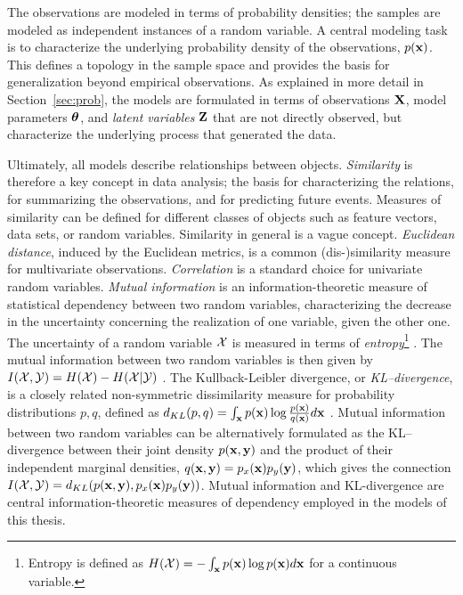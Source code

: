 The observations are modeled in terms of probability densities; the
samples are modeled as independent instances of a random variable.  A
central modeling task is to characterize the underlying probability
density of the observations, \(p(\mathbf{x})\). This defines a topology in the
sample space and provides the basis for generalization beyond
empirical observations. As explained in more detail in
Section~\ref{sec:prob}, the models are formulated in terms of
observations \(\mathbf{X}\), model parameters $\boldsymbol{\theta}$, and {\it latent
  variables} \(\mathbf{Z}\) that are not directly observed, but characterize
the underlying process that generated the data.

Ultimately, all models describe relationships between objects.  {\it
Similarity} is therefore a key concept in data analysis; the basis for
characterizing the relations, for summarizing the observations, and
for predicting future events. Measures of similarity can be defined
for different classes of objects such as feature vectors, data sets,
or random variables. Similarity in general is a vague concept. {\it
Euclidean distance}, induced by the Euclidean metrics, is a common
(dis-)similarity measure for multivariate observations. {\it
Correlation} is a standard choice for univariate random variables.
{\it Mutual information} is an information-theoretic measure of
statistical dependency between two random variables, characterizing
the decrease in the uncertainty concerning the realization of one
variable, given the other one. The uncertainty of a random variable
\(\mathcal{X}\) is measured in terms of {\it entropy}\footnote{Entropy is
defined as \(H(\mathcal{X}) = - \int_{\mathbf{x}} p(\mathbf{x})\log p(\mathbf{x}) d\mathbf{x}\) for a
continuous variable.} \citep{Shannon48}. The mutual information
between two random variables is then given by \(I(\mathcal{X}, \mathcal{Y}) =
H(\mathcal{X}) - H(\mathcal{X}|\mathcal{Y})\) \citep[see e.g.][]{Gelman03}. The
Kullback-Leibler divergence, or {\it KL--divergence}, is a closely
related non-symmetric dissimilarity measure for probability
distributions \(p, q\), defined as \(d_{KL} (p,q) = \int_{\mathbf{x}} p(\mathbf{x})
\log \frac{p(\mathbf{x})}{q(\mathbf{x})}d\mathbf{x}\) \citep[see e.g.][]{Bishop06}. Mutual
information between two random variables can be alternatively
formulated as the KL--divergence between their joint density
\(p(\mathbf{x},\mathbf{y})\) and the product of their independent marginal densities,
\(q(\mathbf{x},\mathbf{y}) = p_x(\mathbf{x})p_y(\mathbf{y})\), which gives the connection \(I(\mathcal{X},
\mathcal{Y}) = d_{KL}(p(\mathbf{x},\mathbf{y}),p_x(\mathbf{x})p_y(\mathbf{y}))\). Mutual information and
KL-divergence are central information-theoretic measures of dependency
employed in the models of this thesis.

